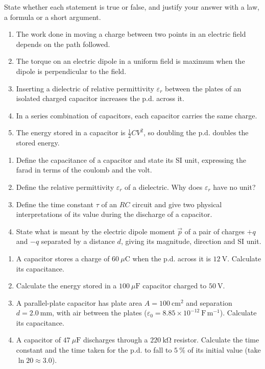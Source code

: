 \documentclass[11pt]{article}
\newcommand{\cle}[1]{{\popxbold\color{popdark}#1}}
\begin{document}
\begin{exercice}
State whether each statement is true or false, and justify your answer with a law, a formula or a short argument.
\begin{enumerate}
\item The work done in moving a charge between two points in an electric field depends on the path followed.
\item The torque on an electric dipole in a uniform field is maximum when the dipole is perpendicular to the field.
\item Inserting a dielectric of relative permittivity $\varepsilon_r$ between the plates of an isolated charged capacitor increases the p.d. across it.
\item In a series combination of capacitors, each capacitor carries the same charge.
\item The energy stored in a capacitor is $\tfrac{1}{2}CV^2$, so doubling the p.d. doubles the stored energy.
\end{enumerate}
\end{exercice}

\begin{exercice}
\begin{enumerate}
\item Define the \cle{capacitance} of a capacitor and state its SI unit, expressing the farad in terms of the coulomb and the volt.
\item Define the \cle{relative permittivity} $\varepsilon_r$ of a dielectric. Why does $\varepsilon_r$ have no unit?
\item Define the \cle{time constant} $\tau$ of an $RC$ circuit and give two physical interpretations of its value during the discharge of a capacitor.
\item State what is meant by the \cle{electric dipole moment} $\vec{p}$ of a pair of charges $+q$ and $-q$ separated by a distance $d$, giving its magnitude, direction and SI unit.
\end{enumerate}
\end{exercice}

\begin{exercice}
\begin{enumerate}
\item A capacitor stores a charge of $60\ \mu\mathrm{C}$ when the p.d. across it is $12\ \mathrm{V}$. Calculate its capacitance.
\item Calculate the energy stored in a $100\ \mu\mathrm{F}$ capacitor charged to $50\ \mathrm{V}$.
\item A parallel-plate capacitor has plate area $A = 100\ \mathrm{cm^2}$ and separation $d = 2.0\ \mathrm{mm}$, with air between the plates ($\varepsilon_0 = 8.85\times10^{-12}\ \mathrm{F\,m^{-1}}$). Calculate its capacitance.
\item A capacitor of $47\ \mu\mathrm{F}$ discharges through a $220\ \mathrm{k\Omega}$ resistor. Calculate the time constant and the time taken for the p.d. to fall to $5\ \%$ of its initial value (take $\ln 20 \approx 3.0$).
\end{enumerate}
\end{exercice}
\end{document}
